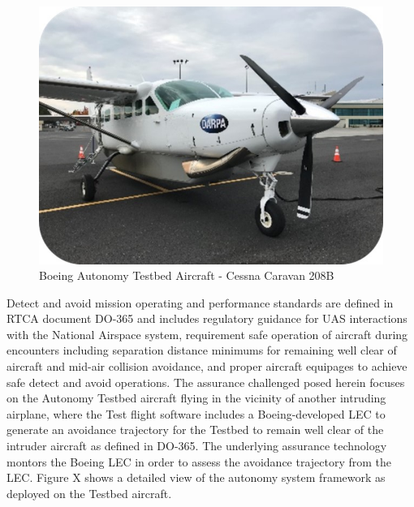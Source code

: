 \begin{figure}
	\centering
	\includegraphics[width=\columnwidth]{figures/caravan.jpg}
	\caption{Boeing Autonomy Testbed Aircraft - Cessna Caravan 208B}
	\label{fig:caravan}
\end{figure}

Detect and avoid mission operating and performance standards are defined in RTCA document DO-365 and includes regulatory guidance for UAS interactions with the National Airspace system, requirement safe operation of aircraft during encounters including separation distance minimums for remaining well clear of aircraft and mid-air collision avoidance, and proper aircraft equipages to achieve safe detect and avoid operations.
The assurance challenged posed herein focuses on the Autonomy Testbed aircraft flying in the vicinity of another intruding airplane, where the Test flight software includes a Boeing-developed LEC to generate an avoidance trajectory for the Testbed to remain well clear of the intruder aircraft as defined in DO-365.  The underlying assurance technology montors the Boeing LEC in order to assess the avoidance trajectory from the LEC.
Figure X shows a detailed view of the autonomy system framework as deployed on the Testbed aircraft.

